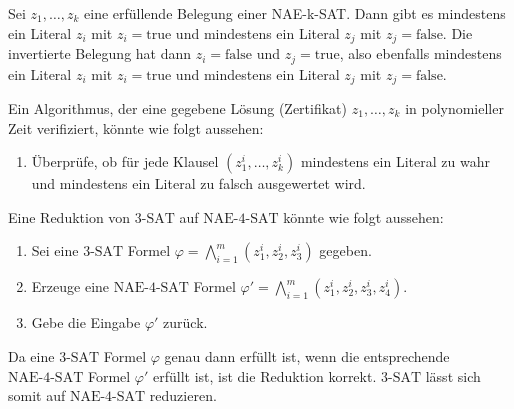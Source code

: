 \documentclass{article}
\begin{document}
\begin{solutions}
  \item Sei $z_1, \ldots, z_k$ eine erfüllende Belegung einer NAE-k-SAT. Dann gibt es mindestens ein Literal $z_i$ mit $z_i = \text{true}$ und mindestens ein Literal $z_j$ mit $z_j = \text{false}$. Die invertierte Belegung hat dann $z_i = \text{false}$ und $z_j = \text{true}$, also ebenfalls mindestens ein Literal $z_i$ mit $z_i = \text{true}$ und mindestens ein Literal $z_j$ mit $z_j = \text{false}$.
  \item Ein Algorithmus, der eine gegebene Lösung (Zertifikat) $z_1, \ldots, z_k$ in polynomieller Zeit verifiziert, könnte wie folgt aussehen:
  \begin{enumerate}
    \item Überprüfe, ob für jede Klausel $(z_1^i, \dots, z_k^i)$ mindestens ein Literal zu wahr und mindestens ein Literal zu falsch ausgewertet wird.
  \end{enumerate}
  \item Eine Reduktion von $3\text{-SAT}$ auf $\text{NAE-4-SAT}$ könnte wie folgt aussehen:
  \begin{enumerate}
    \item Sei eine $3\text{-SAT}$ Formel $\varphi = \bigwedge_{i=1}^m (z_1^i, z_2^i, z_3^i)$ gegeben.
    \item Erzeuge eine $\text{NAE-4-SAT}$ Formel $\varphi' = \bigwedge_{i=1}^m (z_1^i, z_2^i, z_3^i, z_4^i)$.
    \item Gebe die Eingabe $\varphi'$ zurück.
  \end{enumerate}
  Da eine $3\text{-SAT}$ Formel $\varphi$ genau dann erfüllt ist, wenn die entsprechende $\text{NAE-4-SAT}$ Formel $\varphi'$ erfüllt ist, ist die Reduktion korrekt. $3\text{-SAT}$ lässt sich somit auf $\text{NAE-4-SAT}$ reduzieren.
\end{solutions}
\end{document}

